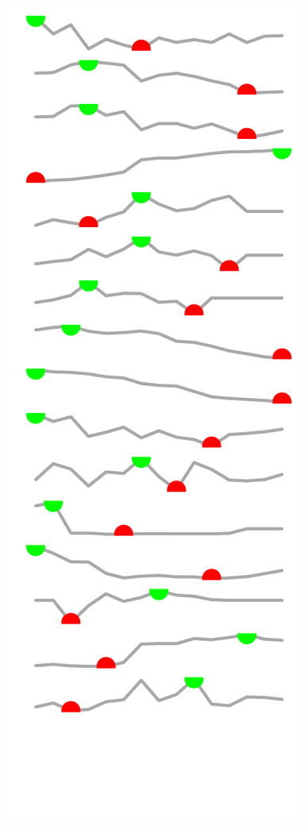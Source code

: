 \documentclass{article}\usepackage[]{graphicx}\usepackage[]{color}
\makeatletter
\def\maxwidth{ %
  \ifdim\Gin@nat@width>\linewidth
    \linewidth
  \else
    \Gin@nat@width
  \fi
}
\makeatother
\begin{document}
\begin{minipage}[b]{0.99\textwidth}
\begin{minipage}[t]{0.99\textwidth}
\begin{minipage}[c]{0.12\textwidth}
{\centering \includegraphics[width=\maxwidth]{figure/createSparklines-1} 

}



      \vspace*{-0.4cm}
      \end{minipage}
 

\end{minipage}
\end{minipage}
\end{document}
